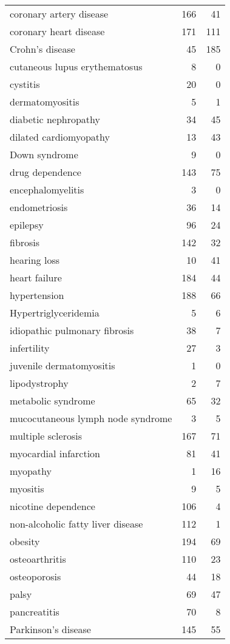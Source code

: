 \begin{table}[ht]
\begin{tabular}{lrr}
  coronary artery disease & 166 & 41 \\ 
  coronary heart disease & 171 & 111 \\ 
  Crohn's disease & 45 & 185 \\ 
  cutaneous lupus erythematosus & 8 & 0 \\ 
  cystitis & 20 & 0 \\ 
  dermatomyositis & 5 & 1 \\ 
  diabetic nephropathy & 34 & 45 \\ 
  dilated cardiomyopathy & 13 & 43 \\ 
  Down syndrome & 9 & 0 \\ 
  drug dependence & 143 & 75 \\ 
  encephalomyelitis & 3 & 0 \\ 
  endometriosis & 36 & 14 \\ 
  epilepsy & 96 & 24 \\ 
  fibrosis & 142 & 32 \\ 
  hearing loss & 10 & 41 \\ 
  heart failure & 184 & 44 \\ 
  hypertension & 188 & 66 \\ 
  Hypertriglyceridemia & 5 & 6 \\ 
  idiopathic pulmonary fibrosis & 38 & 7 \\ 
  infertility & 27 & 3 \\ 
  juvenile dermatomyositis & 1 & 0 \\ 
  lipodystrophy & 2 & 7 \\ 
  metabolic syndrome & 65 & 32 \\ 
  mucocutaneous lymph node syndrome & 3 & 5 \\ 
  multiple sclerosis & 167 & 71 \\ 
  myocardial infarction & 81 & 41 \\ 
  myopathy & 1 & 16 \\ 
  myositis & 9 & 5 \\ 
  nicotine dependence & 106 & 4 \\ 
  non-alcoholic fatty liver disease & 112 & 1 \\ 
  obesity & 194 & 69 \\ 
  osteoarthritis & 110 & 23 \\ 
  osteoporosis & 44 & 18 \\ 
  palsy & 69 & 47 \\ 
  pancreatitis & 70 & 8 \\ 
  Parkinson's disease & 145 & 55 \\ 

\end{tabular}
\end{table}
